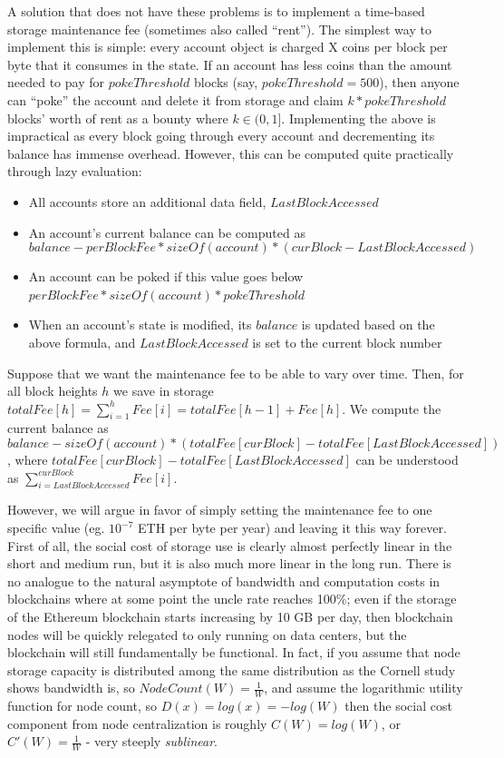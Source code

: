 \documentclass[12pt, final]{article}
\begin{document}
A solution that does not have these problems is to implement a time-based storage maintenance fee (sometimes also called ``rent''). The simplest way to implement this is simple: every account object is charged X coins per block per byte that it consumes in the state. If an account has less coins than the amount needed to pay for $pokeThreshold$ blocks (say, $pokeThreshold = 500$), then anyone can ``poke'' the account and delete it from storage and claim $k * pokeThreshold$ blocks' worth of rent as a bounty where $k \in (0,1]$. Implementing the above is impractical as every block going through every account and decrementing its balance has immense overhead. However, this can be computed quite practically through lazy evaluation:

\begin{itemize}
\item All accounts store an additional data field, $LastBlockAccessed$
\item An account's current balance can be computed as $$balance - perBlockFee * sizeOf(account) * (curBlock - LastBlockAccessed)$$
\item An account can be poked if this value goes below $perBlockFee * sizeOf(account) * pokeThreshold$
\item When an account's state is modified, its $balance$ is updated based on the above formula, and $LastBlockAccessed$ is set to the current block number
\end{itemize}

Suppose that we want the maintenance fee to be able to vary over time. Then, for all block heights $h$ we save in storage $totalFee[h] = \sum_{i=1}^h Fee[i] = totalFee[h-1] + Fee[h]$. We compute the current balance as $$balance - sizeOf(account) * (totalFee[curBlock] - totalFee[LastBlockAccessed])$$, where $totalFee[curBlock] - totalFee[LastBlockAccessed]$ can be understood as $\sum_{i=LastBlockAccessed}^{curBlock} Fee[i]$.

However, we will argue in favor of simply setting the maintenance fee to one specific value (eg. $10^{-7}$ ETH per byte per year) and leaving it this way forever. First of all, the social cost of storage use is clearly almost perfectly linear in the short and medium run, but it is also much more linear in the long run. There is no analogue to the natural asymptote of bandwidth and computation costs in blockchains where at some point the uncle rate reaches 100\%; even if the storage of the Ethereum blockchain starts increasing by 10 GB per day, then blockchain nodes will be quickly relegated to only running on data centers, but the blockchain will still fundamentally be functional. In fact, if you assume that node storage capacity is distributed among the same distribution as the Cornell study\cite{cornell} shows bandwidth is, so $NodeCount(W) = \frac{1}{W}$, and assume the logarithmic utility function for node count, so $D(x) = log(x) = -log(W)$ then the social cost component from node centralization is roughly $C(W) = log(W)$, or $C'(W) = \frac{1}{W}$ - very steeply \emph{sublinear}.
\end{document}
